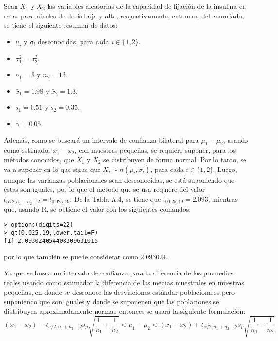 \begin{solucion}
 Sean $X_1$ y $X_2$ las variables aleatorias de la capacidad de fijaci\'on de la insulina en ratas para niveles de dosis baja y alta, respectivamente, entonces, del enunciado, se tiene el siguiente resumen de datos:
 \begin{itemize}
  \item $\mu_i$ y $\sigma_i$ desconocidas, para cada $i \in \{ 1, 2 \}$.
  \item $\sigma_1^2 = \sigma_2^2$.
  \item $n_1 = 8$ y $n_2 = 13$.
  \item $\bar{x}_1 = 1.98$ y $\bar{x}_2 = 1.3$.
  \item $s_1 = 0.51$ y $s_2 = 0.35$.
  \item $\alpha = 0.05$.
 \end{itemize}
 Adem\'as, como se buscar\'a un intervalo de confianza bilateral para $\mu_1 - \mu_2$, usando como estimador $\bar{x}_1 - \bar{x}_2$, con muestras peque\~nas, se requiere suponer, para los m\'etodos conocidos, que $X_1$ y $X_2$ se distribuyen de forma normal. Por lo tanto, se va a suponer en lo que sigue que $X_i \sim n\left( \mu_i, \sigma_i \right)$, para cada $i \in \{ 1, 2 \}$. Luego, aunque las varianzas poblacionales sean desconocidas, se est\'a suponiendo que \'estas son iguales, por lo que el m\'etodo que se usa requiere del valor $t_{\alpha/2,n_1+n_2-2} = t_{0.025,19}$. De la Tabla A.4, se tiene que $t_{0.025,19} = 2.093$, mientras que, usando R, se obtiene el valor con los siguientes comandos:
 \begin{verbatim}
> options(digits=22)
> qt(0.025,19,lower.tail=F)
[1] 2.093024054408309631015
 \end{verbatim}
 \vspace{-0.5cm}
 por lo que tambi\'en se puede considerar como $2.093024$.
 \par 
 Ya que se busca un intervalo de confianza para la diferencia de los promedios reales usando como estimador la diferencia de las  medias muestrales en muestras peque\~nas, en donde se desconoce las desviaciones est\'andar poblacionales pero suponiendo que son iguales y donde se suponenen que las poblaciones se distribuyen aproximadamente normal, entonces se usar\'a la siguiente formulaci\'on:
 \begin{equation*}
  \left( \bar{x}_1 - \bar{x}_2 \right) - t_{\alpha/2,n_1+n_2-2} s_p \sqrt{\frac{1}{n_1} + \frac{1}{n_2}} < \mu_1 - \mu_2 < \left( \bar{x}_1 - \bar{x}_2 \right) + t_{\alpha/2,n_1+n_2-2} s_p \sqrt{\frac{1}{n_1} + \frac{1}{n_2}}

\end{equation*}
\end{solucion}
